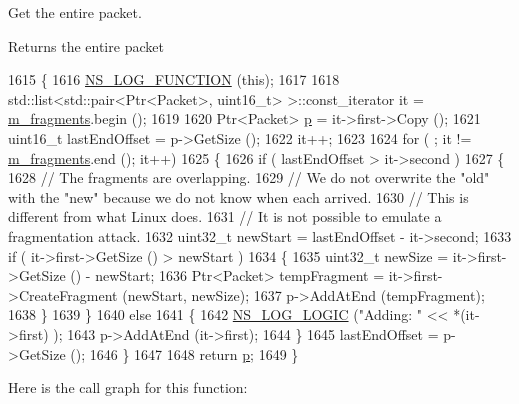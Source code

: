 Get the entire packet. 

\begin{DoxyReturn}{Returns}
the entire packet 
\end{DoxyReturn}

\begin{DoxyCode}
1615 \{
1616   \hyperlink{log-macros-disabled_8h_a90b90d5bad1f39cb1b64923ea94c0761}{NS\_LOG\_FUNCTION} (\textcolor{keyword}{this});
1617 
1618   std::list<std::pair<Ptr<Packet>, uint16\_t> >::const\_iterator it = \hyperlink{classns3_1_1Ipv4L3Protocol_1_1Fragments_a5647938dd668471f5872839589d104d9}{m\_fragments}.begin ();
1619 
1620   Ptr<Packet> \hyperlink{lte__link__budget_8m_ac9de518908a968428863f829398a4e62}{p} = it->first->Copy ();
1621   uint16\_t lastEndOffset = p->GetSize ();
1622   it++;
1623 
1624   \textcolor{keywordflow}{for} ( ; it != \hyperlink{classns3_1_1Ipv4L3Protocol_1_1Fragments_a5647938dd668471f5872839589d104d9}{m\_fragments}.end (); it++)
1625     \{
1626       \textcolor{keywordflow}{if} ( lastEndOffset > it->second )
1627         \{
1628           \textcolor{comment}{// The fragments are overlapping.}
1629           \textcolor{comment}{// We do not overwrite the "old" with the "new" because we do not know when each arrived.}
1630           \textcolor{comment}{// This is different from what Linux does.}
1631           \textcolor{comment}{// It is not possible to emulate a fragmentation attack.}
1632           uint32\_t newStart = lastEndOffset - it->second;
1633           \textcolor{keywordflow}{if} ( it->first->GetSize () > newStart )
1634             \{
1635               uint32\_t newSize = it->first->GetSize () - newStart;
1636               Ptr<Packet> tempFragment = it->first->CreateFragment (newStart, newSize);
1637               p->AddAtEnd (tempFragment);
1638             \}
1639         \}
1640       \textcolor{keywordflow}{else}
1641         \{
1642           \hyperlink{group__logging_ga88acd260151caf2db9c0fc84997f45ce}{NS\_LOG\_LOGIC} (\textcolor{stringliteral}{"Adding: "} << *(it->first) );
1643           p->AddAtEnd (it->first);
1644         \}
1645       lastEndOffset = p->GetSize ();
1646     \}
1647 
1648   \textcolor{keywordflow}{return} \hyperlink{lte__link__budget_8m_ac9de518908a968428863f829398a4e62}{p};
1649 \}
\end{DoxyCode}


Here is the call graph for this function\+:


